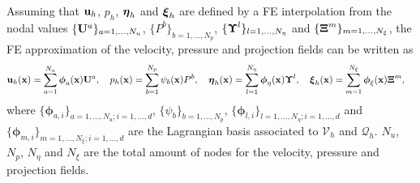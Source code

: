 Assuming that ${\bf u}_h$, $p_h$, $\boldsymbol{\eta}_h$ and $\boldsymbol{\xi}_h$ are defined by a FE interpolation from the nodal values $\{{\bf U}^a\}_{a=1,...,N_u}$, $\{P^b\}_{b=1,...,N_p}$, $\{\boldsymbol{\Upsilon}^l\}_{l=1,...,N_\eta}$ and $\{{\boldsymbol{\Xi}}^m\}_{m=1,...,N_\xi}$, the FE approximation of the velocity, pressure and projection fields can be written as
\begin{align*}
&{\bf u}_h({\bf x})=\sum_{a=1}^{N_u}\boldsymbol{\phi}_a({\bf x}){\bf U}^a,\quad p_h({\bf x})=\sum_{b=1}^{N_p}\psi_b({\bf x})P^b,\quad \boldsymbol{\eta}_h({\bf x})=\sum_{l=1}^{N_\eta}\boldsymbol{\phi}_\eta({\bf x})\boldsymbol{\Upsilon}^l,\quad \boldsymbol{\xi}_h({\bf x})=\sum_{m=1}^{N_\xi}\boldsymbol{\phi}_\xi({\bf x}){\boldsymbol{\Xi}}^m,
\end{align*}
where $\{\boldsymbol{\phi}_{a,i}\}_{a=1,...,N_u;i=1,...,d}$, $\{\psi_b\}_{b=1,...,N_p}$, $\{\boldsymbol{\phi}_{l,i}\}_{l=1,...,N_\eta;i=1,...,d}$ and $\{\boldsymbol{\phi}_{m,i}\}_{m=1,...,N_\xi;i=1,...,d}$ are the Lagrangian basis associated to $\mathcal{V}_h$ and $\mathcal{Q}_h$. $N_u$, $N_p$, $N_\eta$ and $N_\xi$ are the total amount of nodes for the velocity, pressure and projection fields. 

